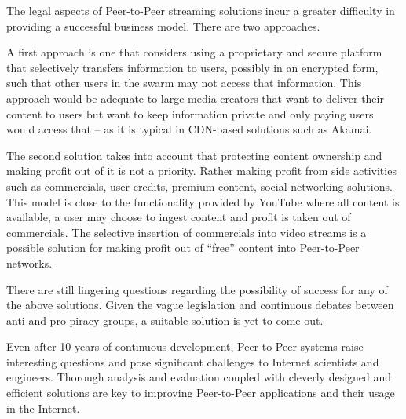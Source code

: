 The legal aspects of Peer-to-Peer streaming solutions incur a greater
difficulty in providing a successful business model. There are two approaches.

A first approach is one that considers using a proprietary and secure platform
that selectively transfers information to users, possibly in an encrypted
form, such that other users in the swarm may not access that information. This
approach would be adequate to large media creators that want to deliver their
content to users but want to keep information private and only paying users
would access that -- as it is typical in CDN-based solutions such as Akamai.

The second solution takes into account that protecting content ownership and
making profit out of it is not a priority. Rather making profit from side
activities such as commercials, user credits, premium content, social
networking solutions. This model is close to the functionality provided by
YouTube where all content is available, a user may choose to ingest content
and profit is taken out of commercials. The selective insertion of commercials
into video streams is a possible solution for making profit out of ``free''
content into Peer-to-Peer networks.

There are still lingering questions regarding the possibility of success for
any of the above solutions. Given the vague legislation and continuous debates
between anti and pro-piracy groups, a suitable solution is yet to come out.

Even after 10 years of continuous development, Peer-to-Peer systems raise
interesting questions and pose significant challenges to Internet scientists
and engineers. Thorough analysis and evaluation coupled with cleverly
designed and efficient solutions are key to improving Peer-to-Peer
applications and their usage in the Internet.
